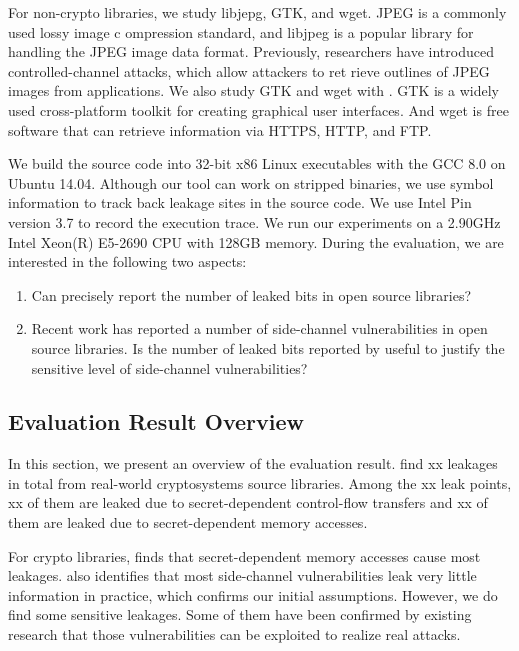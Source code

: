 For non-crypto libraries, we study libjepg, GTK, and wget.
JPEG is a commonly used lossy image c ompression standard, and
libjpeg is a popular library for handling the JPEG image data
format. Previously, researchers have introduced controlled-channel
attacks, which allow attackers to ret rieve outlines of JPEG images
from applications. We also study GTK and wget with \tool{}. GTK 
is a widely used cross-platform toolkit for creating graphical user
interfaces. And wget is free software that can retrieve information
via HTTPS, HTTP, and FTP.

We build the source code into 32-bit x86 Linux executables with the 
GCC 8.0 on Ubuntu 14.04. Although our tool can
work on stripped binaries, we use symbol information to track
back leakage sites in the source code. We use Intel Pin version 3.7 
to record the execution trace. We run our experiments on a 2.90GHz
Intel Xeon(R) E5-2690 CPU with 128GB memory.
During the evaluation, we are interested in the following two
aspects:
\begin{enumerate}
    
    \item  Can \tool{} precisely
    report the number of leaked bits in open source libraries?
    \item  Recent work has reported a number
    of side-channel vulnerabilities in open source libraries. 
    Is the number of leaked bits reported by \tool{} useful to justify 
    the sensitive level of side-channel vulnerabilities?
   
\end{enumerate}

\subsection{Evaluation Result Overview}
In this section, we present an overview of the evaluation result. 
\tool{} find xx leakages in total from real-world cryptosystems source libraries.
 Among the xx leak points, xx of them are leaked due
to secret-dependent control-flow transfers and xx of them are leaked 
due to secret-dependent memory accesses. 

For crypto libraries, \tool{} finds that secret-dependent memory accesses 
cause most leakages. 
\tool{} also identifies that most side-channel vulnerabilities 
leak very little information in practice, which confirms our initial
assumptions. 
However, we do find some sensitive leakages. 
Some of them have been confirmed by existing research that those 
vulnerabilities can be exploited to realize real attacks. 

